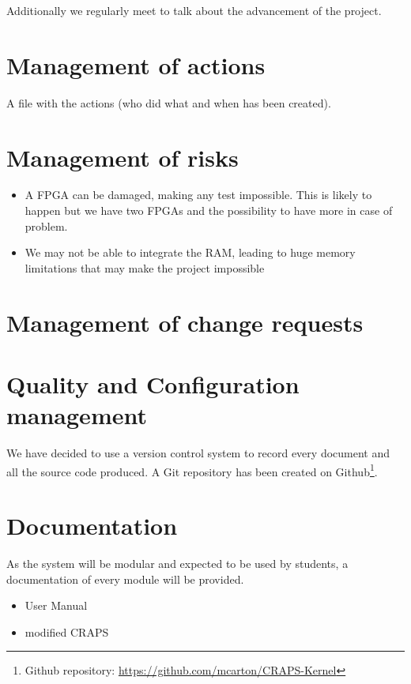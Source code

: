 \documentclass{article}
\begin{document}
    Additionally we regularly meet to talk about the advancement of the project.

  \section{Management of actions}
    A file with the actions (who did what and when has been created).

  \section{Management of risks}
    \begin{itemize}
      \item A FPGA can be damaged, making any test impossible. This is likely to
          happen but we have two FPGAs and the possibility to have more in case
          of problem.
      \item We may not be able to integrate the RAM, leading to huge memory
          limitations that may make the project impossible
    \end{itemize}

  \section{Management of change requests}

  \section{Quality and Configuration management}
    We have decided to use a version control system to record every document and
    all the source code produced. A Git repository has been created on
    Github\footnote{Github repository:
    \url{https://github.com/mcarton/CRAPS-Kernel}}.

  \section{Documentation}
    As the system will be modular and expected to be used by students, a
    documentation of every module will be provided.

    \begin{itemize}
      \item User Manual
      \item modified CRAPS
    \end{itemize}
\end{document}
